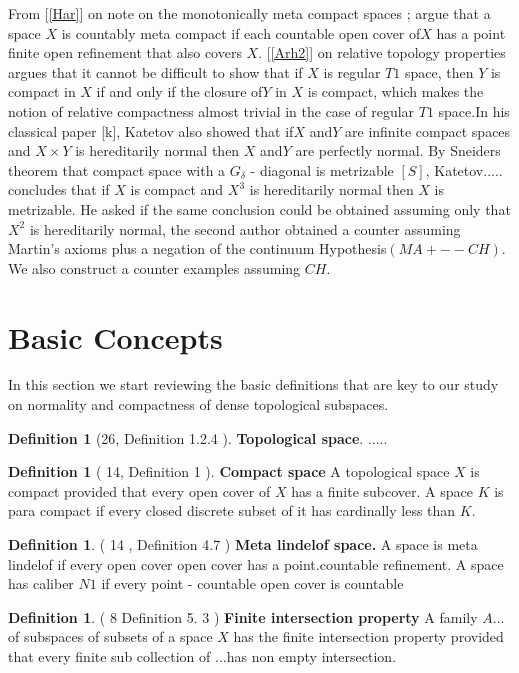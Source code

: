 \documentclass[PhD,14,a4paper]{report}
\theoremstyle{plain}
\theoremstyle{definition}
\newtheorem{defn}[thm]{Definition}
\theoremstyle{remark}
\numberwithin{figure}{section}
\numberwithin{equation}{subsection}
\begin{document}
{From [\ref{Har}] on note on the monotonically meta compact spaces ; argue that a space $X$ is countably meta compact if each countable open cover of$ X$ has a point finite open refinement that also covers $X$. [\ref{Arh2}] on relative topology properties argues that it cannot be difficult to show that if $X$ is regular $T1$ space, then $Y$ is compact in $X$ if and only if the closure of$ Y$ in $X$ is compact, which makes the notion of relative compactness almost trivial in the case of regular $T1$ space.In his classical paper [k], Katetov also showed that if$ X$ and$ Y$ are infinite compact spaces and $X\times{Y}$ is hereditarily normal then $X$ and$ Y$ are perfectly normal. By Sneiders theorem that compact space with a $G_\delta$ - diagonal is metrizable $[S]$, Katetov..... concludes that if $X$ is compact and $X^{3}$ is hereditarily normal then $X$ is metrizable. He asked if the same conclusion could be obtained assuming only that $X^2$ is hereditarily normal,  the second author obtained a counter assuming Martin's axioms plus a negation of the continuum Hypothesis$(MA+--CH)$. We also construct a counter examples assuming $CH$.

\section{Basic Concepts}
\noindent In this section we start reviewing the basic definitions that are key to our study on normality and compactness of dense topological subspaces.

\begin{defn}
[26, Definition 1.2.4 ] \textbf{Topological space}. .....

\end{defn}


\begin{defn}
[ 14, Definition 1 ]  \textbf{Compact space}
A topological space $X$ is compact provided that every open cover of $X$ has a finite subcover. A space $K$ is para compact if every closed  discrete subset of it has cardinally less than $K$.
\end{defn}

\begin{defn}
( 14 , Definition 4.7 ) \textbf{Meta lindelof space.}  A space is meta lindelof if every open cover open cover has a point.countable refinement. A space has caliber $N1$ if every point -  countable open cover is countable
\end{defn}


\begin{defn}  ( 8 Definition 5. 3 ) \textbf{Finite intersection property}
A family $A...$ of subspaces of subsets of a space $X$ has the finite intersection property provided that every finite sub collection of ...has non empty intersection.
\end{defn}


}
\end{document}
